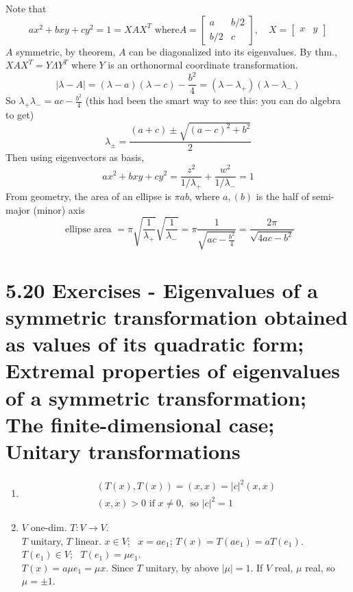 \documentclass[twoside]{amsart}
\theoremstyle{plain}
\theoremstyle{definition}
\newcommand{\exercisehead}[1]
  {
   \noindent{\small\bf Exercise #1.}
   \smallskip}
\begin{document}
\exercisehead{20} Note that 
\[
ax^2 +bxy +cy^2 = 1 = X AX^T \text{ where} A = \left[ \begin{matrix} a & b/2 \\ b/2 & c \end{matrix} \right], \quad X = \left[ \begin{matrix} x & y \end{matrix} \right]
\]
$A$ symmetric, by theorem, $A$ can be diagonalized into its eigenvalues.  By thm., $XAX^T = Y\Lambda Y^T$ where $Y$ is an orthonormal coordinate transformation.  
\[
|\lambda -A | = (\lambda - a)(\lambda - c) - \frac{b^2}{4} = (\lambda - \lambda_+)(\lambda - \lambda_-)
\]
So $\lambda_+ \lambda_- = ac - \frac{b^2}{4}$ (this had been the smart way to see this: you can do algebra to get)
\[
\lambda_{\pm} = \frac{ (a+c) \pm \sqrt{ (a-c)^2 + b^2 }}{2} 
\]
Then using eigenvectors as basis,
\[
ax^2  + bxy + cy^2 = \frac{ z^2}{ 1/ \lambda_+} + \frac{ w^2 }{ 1/\lambda_-} = 1
\]
From geometry, the area of an ellipse is $\pi ab$, where $a,(b)$ is the half of semi-major (minor) axis
\[
\text{ ellipse area } = \pi \sqrt{ \frac{1}{ \lambda_+ } }\sqrt{ \frac{1}{ \lambda_-} } = \pi \frac{1}{ \sqrt{ ac - \frac{b^2}{4} } } = \frac{ 2 \pi }{ \sqrt{ 4ac - b^2} }
\]


\section*{ 5.20 Exercises - Eigenvalues of a symmetric transformation obtained as values of its quadratic form; Extremal properties of eigenvalues of a symmetric transformation; The finite-dimensional case; Unitary transformations }

\exercisehead{1} \begin{enumerate}
\item \[
\begin{gathered}
  (T(x),T(x)) = (x,x) = |c|^2(x,x) \\
  (x,x) > 0 \text{ if } x \neq 0, \, \text{ so } \boxed{ |c|^2 = 1  }
\end{gathered}
\]
\item $V$ one-dim.  $T:V \to V$.  \\
  $T$ unitary, $T$ linear.  $x \in V$; \, $x = ae_1$; $T(x) = T(ae_1) = aT(e_1)$.  $T(e_1) \in V$; \, $T(e_1) = \mu e_1$.   \smallskip \\
  $T(x) = a\mu e_1 = \mu x$.  Since $T$ unitary, by above $|\mu | =1$.  If $V$ real, $\mu$ real, so $\mu = \pm 1$.  
\end{enumerate}
\end{document}
